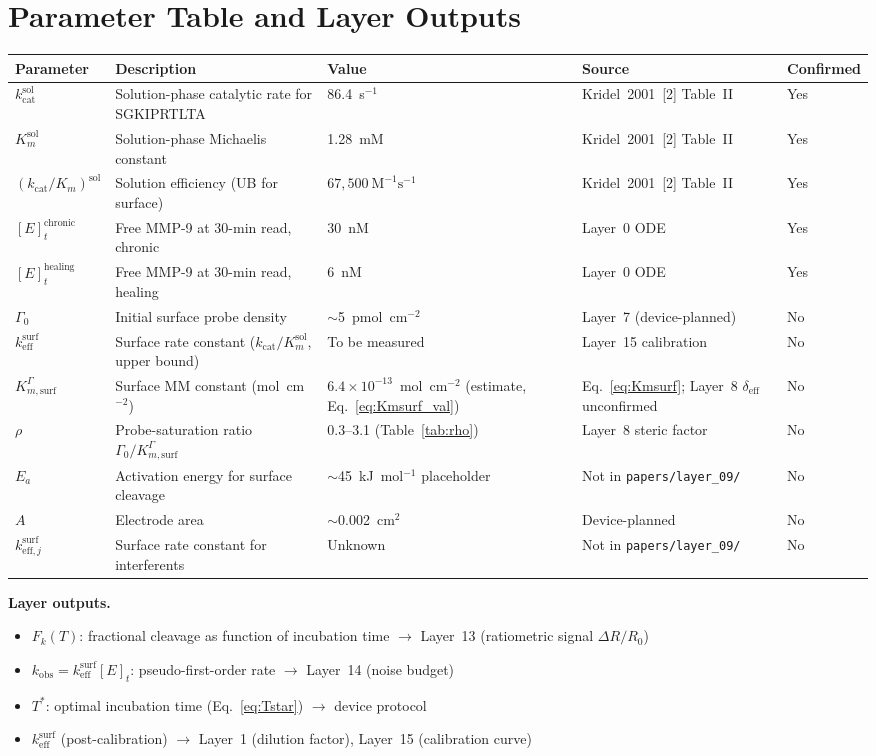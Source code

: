 \documentclass[10pt,a4paper]{article}
\numberwithin{equation}{section}
\newcommand{\Mms}{\text{M}^{-1}\text{s}^{-1}}
\newcommand{\cit}[1]{[#1]}
\newcommand{\kcat}{k_{\text{cat}}}
\newcommand{\keff}{k_{\text{eff}}}
\newcommand{\Gz}{\Gamma_0}
\begin{document}
\section{Parameter Table and Layer Outputs}
\label{sec:params}

\begin{tabularx}{\linewidth}{lXlll}
\toprule
Parameter & Description & Value & Source & Confirmed \\
\midrule
$\kcat^{\text{sol}}$ & Solution-phase catalytic rate for SGKIPRTLTA & 86.4~s$^{-1}$ & Kridel~2001~\cit{2} Table~II & Yes \\
$K_m^{\text{sol}}$ & Solution-phase Michaelis constant & 1.28~mM & Kridel~2001~\cit{2} Table~II & Yes \\
$(\kcat/K_m)^{\text{sol}}$ & Solution efficiency (UB for surface) & $67{,}500\ \Mms$ & Kridel~2001~\cit{2} Table~II & Yes \\
$[E]_t^{\text{chronic}}$ & Free MMP-9 at 30-min read, chronic & 30~nM & Layer~0 ODE & Yes \\
$[E]_t^{\text{healing}}$ & Free MMP-9 at 30-min read, healing & 6~nM & Layer~0 ODE & Yes \\
$\Gz$ & Initial surface probe density & $\sim$5~pmol~cm$^{-2}$ & Layer~7 (device-planned) & No \\
$\keff^{\text{surf}}$ & Surface rate constant ($\kcat/K_m^{\text{sol}}$, upper bound) & To be measured & Layer~15 calibration & No \\
$K_{m,\text{surf}}^\Gamma$ & Surface MM constant (mol~cm$^{-2}$) & $6.4\times10^{-13}$~mol~cm$^{-2}$ (estimate, Eq.~\ref{eq:Kmsurf_val}) & Eq.~\ref{eq:Kmsurf}; Layer~8 $\delta_{\text{eff}}$ unconfirmed & No \\
$\rho$ & Probe-saturation ratio $\Gz/K_{m,\text{surf}}^\Gamma$ & 0.3--3.1 (Table~\ref{tab:rho}) & Layer~8 steric factor & No \\
$E_a$ & Activation energy for surface cleavage & $\sim$45~kJ~mol$^{-1}$ placeholder & Not in \texttt{papers/layer\_09/} & No \\
$A$ & Electrode area & $\sim$0.002~cm$^2$ & Device-planned & No \\
$k_{\text{eff},j}^{\text{surf}}$ & Surface rate constant for interferents & Unknown & Not in \texttt{papers/layer\_09/} & No \\
\bottomrule
\end{tabularx}

\medskip
\noindent\textbf{Layer outputs.}
\begin{itemize}[noitemsep]
  \item $F_k(T)$: fractional cleavage as function of incubation time $\to$ Layer~13 (ratiometric signal $\Delta R/R_0$)
  \item $k_{\text{obs}} = \keff^{\text{surf}}[E]_t$: pseudo-first-order rate $\to$ Layer~14 (noise budget)
  \item $T^*$: optimal incubation time (Eq.~\eqref{eq:Tstar}) $\to$ device protocol
  \item $\keff^{\text{surf}}$ (post-calibration) $\to$ Layer~1 (dilution factor), Layer~15 (calibration curve)
\end{itemize}
\end{document}
